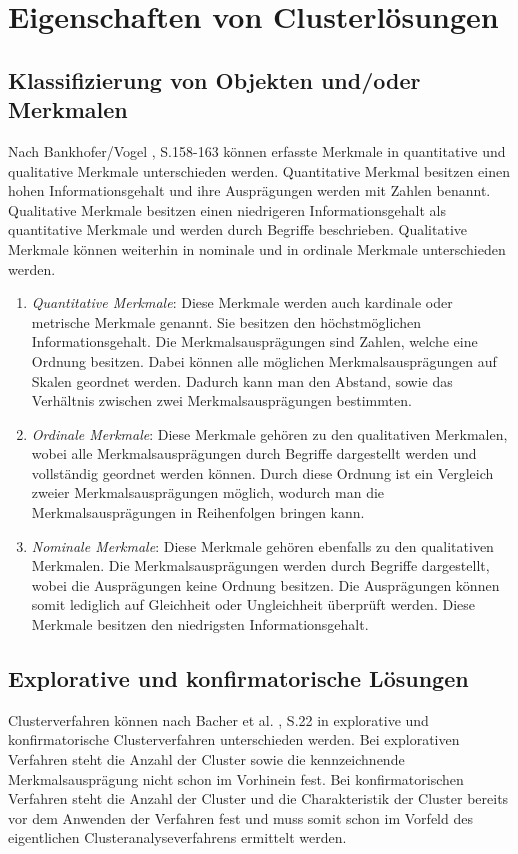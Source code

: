 \chapter{Eigenschaften von Clusterlösungen}

\section{Klassifizierung von Objekten und/oder Merkmalen}
Nach Bankhofer/Vogel \cite{Bankhofer.2008}, S.158-163 können erfasste Merkmale in quantitative und qualitative Merkmale unterschieden werden.
Quantitative Merkmal besitzen einen hohen Informationsgehalt und ihre Ausprägungen werden mit Zahlen benannt. Qualitative Merkmale besitzen einen niedrigeren Informationsgehalt als quantitative Merkmale und werden durch Begriffe beschrieben. Qualitative Merkmale können weiterhin in nominale und in ordinale Merkmale unterschieden werden.

\begin{enumerate}
        \item \textit{Quantitative Merkmale}: Diese Merkmale werden auch kardinale oder metrische Merkmale genannt. Sie besitzen den höchstmöglichen Informationsgehalt. Die Merkmalsausprägungen sind Zahlen, welche eine Ordnung besitzen. Dabei können alle möglichen Merkmalsausprägungen auf Skalen geordnet werden. Dadurch kann man den Abstand, sowie das Verhältnis zwischen zwei Merkmalsausprägungen bestimmten.
        \item \textit{Ordinale Merkmale}: Diese Merkmale gehören zu den qualitativen Merkmalen, wobei alle Merkmalsausprägungen durch Begriffe dargestellt werden und vollständig geordnet werden können. Durch diese Ordnung ist ein Vergleich zweier Merkmalsausprägungen möglich, wodurch man die Merkmalsausprägungen in Reihenfolgen bringen kann.
        \item \textit{Nominale Merkmale}: Diese Merkmale gehören ebenfalls zu den qualitativen Merkmalen. Die Merkmalsausprägungen werden durch Begriffe dargestellt, wobei die Ausprägungen keine Ordnung besitzen. Die Ausprägungen können somit lediglich auf Gleichheit oder Ungleichheit überprüft werden. Diese Merkmale besitzen den niedrigsten Informationsgehalt.
\end{enumerate}

\section{Explorative und konfirmatorische Lösungen}
Clusterverfahren können nach Bacher et al. \cite{Bacher.2010}, S.22 in explorative und konfirmatorische Clusterverfahren unterschieden werden. 
Bei explorativen Verfahren steht die Anzahl der Cluster sowie die kennzeichnende Merkmalsausprägung nicht schon im Vorhinein fest.
Bei konfirmatorischen Verfahren steht die Anzahl der Cluster und die Charakteristik der Cluster bereits vor dem Anwenden der Verfahren fest und muss somit schon im Vorfeld des eigentlichen Clusteranalyseverfahrens ermittelt werden.

